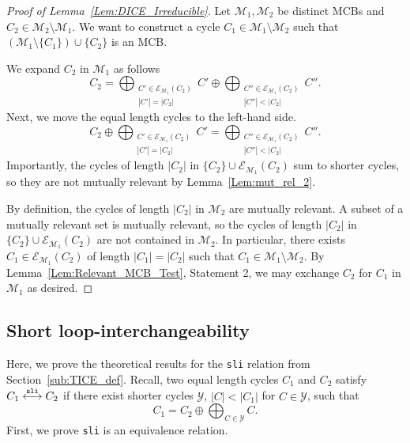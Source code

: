 \documentclass[fleqn,11pt]{article}
\newcommand\calM{\mathcal{M}}
\newcommand\calY{\mathcal{Y}}
\newcommand\expand[2]{\mathcal{E}_{#1}\left(#2\right)}   %
\newcommand\slInt{ \stackrel{\tt sli}{\longleftrightarrow} }
\begin{document}
\begin{proof}[Proof of Lemma~\ref{Lem:DICE_Irreducible}]
	Let $\calM_1,\calM_2$ be distinct MCBs and $C_2\in\calM_2\setminus\calM_1$. We want to construct a cycle $C_1\in\calM_1\setminus\calM_2$ such that $(\calM_1\setminus\{C_1\})\cup\{C_2\}$ is an MCB.
	
	We expand $C_2$ in $\calM_1$ as follows
	\begin{equation}
		C_2 = \bigoplus_{{\substack{C'\in\expand{\calM_1}{C_2}\\|C'|=|C_2|}}}C'
		\oplus
		\bigoplus_{{\substack{C''\in\expand{\calM_1}{C_2}\\|C''|<|C_2|}}}C''.
	\end{equation} 
	Next, we move the equal length cycles to the left-hand side.
	\begin{equation}
		C_2 \oplus \bigoplus_{\substack{C'\in\expand{\calM_1}{C_2}\\|C'|=|C_2|}}C'
		=
		\bigoplus_{\substack{C''\in\expand{\calM_1}{C_2}\\|C''|<|C_2|}}C''.
	\end{equation}
	Importantly, the cycles of length $|C_2|$ in $\{C_2\}\cup\expand{\calM_1}{C_2}$ sum to shorter cycles, so they are not mutually relevant by Lemma~\ref{Lem:mut_rel_2}.
	
	By definition, the cycles of length $|C_2|$ in $\calM_2$ are mutually relevant. A subset of a mutually relevant set is mutually relevant, so the cycles of length $|C_2|$ in $\{C_2\}\cup\expand{\calM_1}{C_2}$ are not contained in $\calM_2$. In particular, there exists $C_1\in\expand{\calM_1}{C_2}$ of length $|C_1|=|C_2|$ such that $C_1\in\calM_1\setminus\calM_2$. By Lemma~\ref{Lem:Relevant_MCB_Test}, Statement 2, we may exchange $C_2$ for $C_1$ in $\calM_1$ as desired.
\end{proof}


\subsection{Short loop-interchangeability}
\label{app:TICE_Proofs}
Here, we prove the theoretical results for the {\tt sli} relation from Section~\ref{sub:TICE_def}.
Recall, two equal length cycles $C_1$ and $C_2$ satisfy $C_1\slInt C_2$ if there exist shorter cycles $\calY$, $|C|{<}|C_1|$ for $C{\in}\calY$, such that
\begin{equation}
	C_1 = C_2 \oplus\bigoplus_{C\in\calY}C.\label{eq:TrEx_def2}
\end{equation}
First, we prove {\tt sli} is an equivalence relation.
\end{document}

